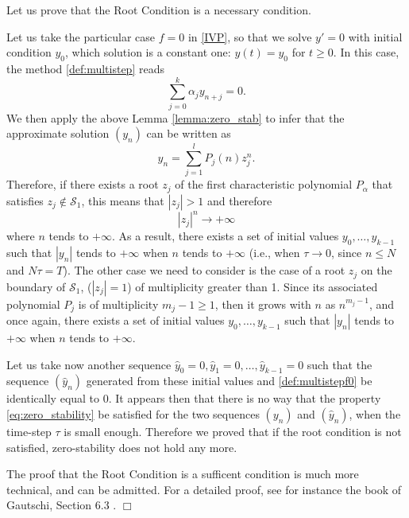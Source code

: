 \documentclass{article}
\begin{document}
 Let us prove that the Root Condition is a necessary condition.

\medskip

Let us take the particular case $f=0$ in \eqref{IVP}, so that we solve $y'=0$ with initial condition $y_0$, which solution is a constant one: $y(t)=y_0$ for $t\geq0$. In this case, the method \eqref{def:multistep} reads
\begin{equation} \label{def:multistepf0}
\sum_{j=0}^k \alpha_j y_{n+j} = 0.    
\end{equation}
We then apply the above Lemma \ref{lemma:zero_stab} to infer that the approximate solution $(y_n)$ can be written as
\[
  y_n = \sum_{j=1}^l P_j(n) z_j^n.
\]
Therefore, if there exists a root $z_j$ of the first characteristic polynomial $P_\alpha$ that satisfies $z_j \notin \mathcal{S}_1$, this means that $|z_j|>1$ and therefore
\[
|z_j|^n \rightarrow + \infty
\]
where $n$ tends to $+\infty$. As a result, there exists a set of initial values $y_0,\ldots,y_{k-1}$ such that $|y_n|$ tends to $+\infty$ when $n$ tends to $+\infty$ (i.e., when $\tau \rightarrow 0$, since $n \leq N$ and $N\tau=T$). The other case we need to consider is the case of a root $z_j$ on the boundary of $\mathcal{S}_1$,  ($|z_j|=1$) of multiplicity greater than 1. Since its associated polynomial $P_j$ is of multiplicity $m_j-1\geq1$, then it grows with $n$ as $n^{m_j-1}$, and once again, there exists a set of initial values $y_0,\ldots,y_{k-1}$ such that $|y_n|$ tends to $+\infty$ when $n$ tends to $+\infty$.

Let us take now another sequence $\hat y_0 = 0, \hat y_1 = 0, \ldots, \hat y_{k-1} = 0$ such that the sequence $(\hat y_n)$ generated from these initial values and \eqref{def:multistepf0} be identically equal to $0$. It appears then that there is no way that the property \eqref{eq:zero_stability} be satisfied for the two sequences $(y_n)$ and $(\hat y_n)$, when the time-step $\tau$ is small enough. %
%
Therefore we proved that if the root condition is not satisfied, zero-stability does not hold any more.

\medskip

The proof that the Root Condition is a sufficent condition is much more technical, and can be admitted. For a detailed proof, see for instance the book of Gautschi, Section 6.3 \cite{gautschi97}. $\Box$

\bigskip
\end{document}
